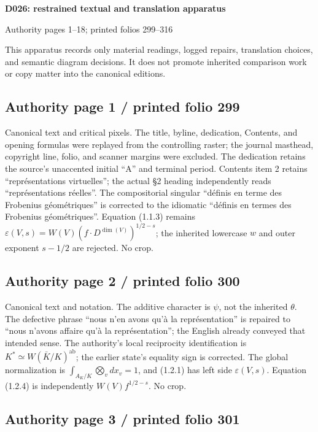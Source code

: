 \documentclass[10pt]{article}
\begin{document}
\begin{center}
{\Large\bfseries D026: restrained textual and translation apparatus}\par
\smallskip
Authority pages 1--18; printed folios 299--316
\end{center}
This apparatus records only material readings, logged repairs, translation choices, and semantic diagram decisions. It does not promote inherited comparison work or copy matter into the canonical editions.


\subsection*{Authority page 1 / printed folio 299}

Canonical text and critical pixels. The title, byline, dedication, Contents, and opening formulas were replayed from the controlling raster; the journal masthead, copyright line, folio, and scanner margins were excluded. The dedication retains the source’s unaccented initial “A” and terminal period. Contents item 2 retains “représentations virtuelles”; the actual §2 heading independently reads “représentations réelles”. The compositorial singular “définis en terme des Frobenius géométriques” is corrected to the idiomatic “définis en termes des Frobenius géométriques”. Equation (1.1.3) remains \(\varepsilon(V,s)=W(V)(f\cdot D^{\dim(V)})^{1/2-s}\); the inherited lowercase \(w\) and outer exponent \(s-1/2\) are rejected. No crop.\par

\subsection*{Authority page 2 / printed folio 300}

Canonical text and notation. The additive character is \(\psi\), not the inherited \(\theta\). The defective phrase “nous n’en avons qu’à la représentation” is repaired to “nous n’avons affaire qu’à la représentation”; the English already conveyed that intended sense. The authority’s local reciprocity identification is \(K^*\simeq W(\bar K/K)^{\mathrm{ab}}\); the earlier state’s equality sign is corrected. The global normalization is \(\int_{A_K/K}\bigotimes_v dx_v=1\), and (1.2.1) has left side \(\varepsilon(V,s)\). Equation (1.2.4) is independently \(W(V)f^{1/2-s}\). No crop.\par

\subsection*{Authority page 3 / printed folio 301}
\end{document}
